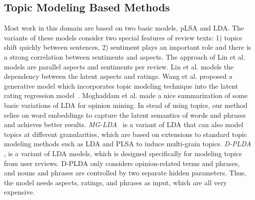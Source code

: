 \subsection{Topic Modeling Based Methods}
Most work in this domain are based on two basic models, 
pLSA\cite{hofmann1999probabilistic} and LDA\cite{Blei2003LatentDA}. 
The variants of these models consider two special features of review texts:
1) topics shift quickly between sentences,
2) sentiment plays an important role and there is a strong 
correlation between sentiments and aspects. 
The approach of Lin et al.  models are 
parallel aspects and sentiments per review. 
Lin et al.  models the dependency between 
the latent aspects and ratings. Wang et al.  proposed 
a generative model which incorporates topic modeling technique 
into the latent rating regression model~\cite{wang2010latent}.
Moghaddam et al.  made a nice 
summarization of some basic variations of LDA for opinion mining.
In stead of using topics, our method relies on word embeddings to capture
the latent semantics of words and phrases and achieves better results.
\emph{MG-LDA}~\cite{titov2008modeling} is a variant of LDA that can also model topics at different granularities, which are based on extensions to standard topic modeling methods such as LDA and PLSA to induce multi-grain topics. 
\emph{D-PLDA} \cite{moghaddam2012design}, 
is a variant of LDA models, which is designed specifically for modeling topics from user reviews.  
D-PLDA only considers opinion-related terms and phrases, 
and nouns and phrases are controlled by two separate hidden parameters. Thus, the model needs aspects, ratings, and phrases as input, which are all very expensive.


